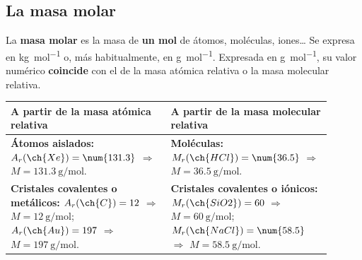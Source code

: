 \subsection{La masa molar}

\begin{definition}
    La \textbf{masa molar} es la masa de \textbf{un mol} de átomos, moléculas, iones\ldots{} Se expresa en \unit{\kg\per\mol} o, más habitualmente, en \unit{\gram\per\mol}. Expresada en \unit{\gram\per\mol}, su valor numérico \textbf{coincide} con el de la masa atómica relativa o la masa molecular relativa.
\end{definition}

\begin{center}
    \begin{tabular}{@{}L{0.45\linewidth} L{0.45\linewidth}@{}}
        \toprule
        \textbf{A partir de la masa atómica relativa} & \textbf{A partir de la masa molecular relativa} \\
        \midrule
        \textbf{Átomos aislados:} \(A_r(\ch{Xe}) = \num{131.3}\) \(\Rightarrow\) \(M = \qty{131.3}{\gram\per\mol}\). & \textbf{Moléculas:} \(M_r(\ch{HCl}) = \num{36.5}\) \(\Rightarrow\) \(M = \qty{36.5}{\gram\per\mol}\). \\[3pt]
        \textbf{Cristales covalentes o metálicos:} \(A_r(\ch{C}) = 12\) \(\Rightarrow\) \(M = \qty{12}{\gram\per\mol}\); \(A_r(\ch{Au}) = 197\) \(\Rightarrow\) \(M = \qty{197}{\gram\per\mol}\). & \textbf{Cristales covalentes o iónicos:} \(M_r(\ch{SiO2}) = 60\) \(\Rightarrow\) \(M = \qty{60}{\gram\per\mol}\); \(M_r(\ch{NaCl}) = \num{58.5}\) \(\Rightarrow\) \(M = \qty{58.5}{\gram\per\mol}\). \\
        \bottomrule
    \end{tabular}
\end{center}

